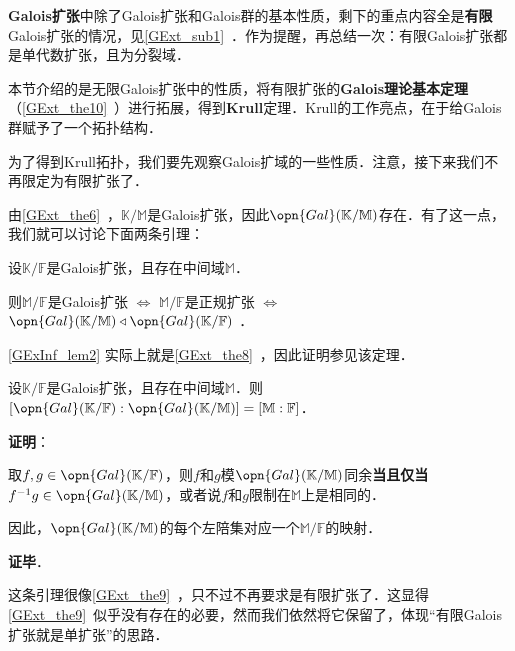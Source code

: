 


\textbf{Galois扩张}中除了Galois扩张和Galois群的基本性质，剩下的重点内容全是\textbf{有限}Galois扩张的情况，见\autoref{GExt_sub1}~．作为提醒，再总结一次：有限Galois扩张都是单代数扩张，且为分裂域．

本节介绍的是无限Galois扩张中的性质，将有限扩张的\textbf{Galois理论基本定理}（\autoref{GExt_the10}~）进行拓展，得到\textbf{Krull}定理．Krull的工作亮点，在于给Galois群赋予了一个拓扑结构．


为了得到Krull拓扑，我们要先观察Galois扩域的一些性质．注意，接下来我们不再限定为有限扩张了．


由\autoref{GExt_the6}~，$\mathbb{K}/\mathbb{M}$是Galois扩张，因此$\opn{Gal}(\mathbb{K}/\mathbb{M})$存在．有了这一点，我们就可以讨论下面两条引理：

\begin{lemma}{}\label{GExInf_lem2}
设$\mathbb{K}/\mathbb{F}$是Galois扩张，且存在中间域$\mathbb{M}$．

则$\mathbb{M}/\mathbb{F}$是Galois扩张 $\iff$ $\mathbb{M}/\mathbb{F}$是正规扩张 $\iff$ $\opn{Gal}(\mathbb{K}/\mathbb{M})\triangleleft \opn{Gal}(\mathbb{K}/\mathbb{F})$ ．
\end{lemma}

\autoref{GExInf_lem2} 实际上就是\autoref{GExt_the8}~，因此证明参见该定理．


\begin{lemma}{}\label{GExInf_lem1}
设$\mathbb{K}/\mathbb{F}$是Galois扩张，且存在中间域$\mathbb{M}$．则$[\opn{Gal}(\mathbb{K}/\mathbb{F}):\opn{Gal}(\mathbb{K}/\mathbb{M})]=[\mathbb{M}:\mathbb{F}]$．


\end{lemma}


\textbf{证明}：

取$f, g\in\opn{Gal}(\mathbb{K}/\mathbb{F})$，则$f$和$g$模$\opn{Gal}(\mathbb{K}/\mathbb{M})$同余\textbf{当且仅当}$f^{-1}g\in\opn{Gal}(\mathbb{K}/\mathbb{M})$，或者说$f$和$g$限制在$\mathbb{M}$上是相同的．

因此，$\opn{Gal}(\mathbb{K}/\mathbb{M})$的每个左陪集对应一个$\mathbb{M}/\mathbb{F}$的映射．

\textbf{证毕}．


这条引理很像\autoref{GExt_the9}~，只不过不再要求是有限扩张了．这显得\autoref{GExt_the9}~似乎没有存在的必要，然而我们依然将它保留了，体现“有限Galois扩张就是单扩张”的思路．




